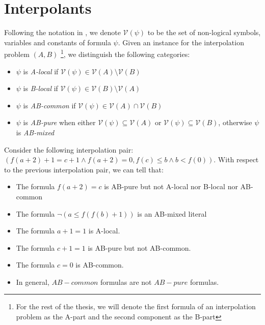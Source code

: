 \section{Interpolants}

Following the notation in \cite{10.1007/11532231_26}, we denote 
$\mathcal{V}(\psi)$ to be the set of non-logical symbols, variables
and constants of formula $\psi$. Given an instance for the interpolation
problem $(A, B)$ \footnote{For the rest of the thesis, we will denote the 
  first formula of an interpolation problem as the A-part 
and the second component as the B-part}, 
we distinguish the following categories:

\begin{itemize}
  \item $\psi$ is \emph{A-local} if $\mathcal{V}(\psi) \in 
    \mathcal{V}(A) \setminus \mathcal{V}(B)$
  \item $\psi$ is \emph{B-local} if $\mathcal{V}(\psi) \in 
    \mathcal{V}(B) \setminus \mathcal{V}(A)$
  \item $\psi$ is \emph{AB-common} if $\mathcal{V}(\psi) \in
    \mathcal{V}(A) \cap \mathcal{V}(B)$
  \item $\psi$ is \emph{AB-pure} when either $\mathcal{V}(\psi) \subseteq 
    \mathcal{V}(A)$ or $\mathcal{V}(\psi) \subseteq \mathcal{V}(B)$, otherwise
    $\psi$ is \emph{AB-mixed}
\end{itemize}

\begin{example} \label{first_example}

  Consider the following interpolation pair: $(f(a + 2) + 1 = c + 1
    \land f(a + 2) = 0
  , f(c) \leq b \land b < f(0))$. With respect to the previous 
  interpolation pair, we can tell that:
  \begin{itemize}
    \item The formula $f(a + 2) = c$ is 
      AB-pure but not A-local nor B-local nor AB-common
    \item The formula $\neg(a \leq f(f(b) + 1))$ is an AB-mixed
      literal
    \item The formula $a + 1 = 1$ is A-local.
    \item The formula $c + 1 = 1$ is AB-pure but not AB-common.
    \item The formula $c = 0$ is AB-common.
    \item In general, $AB-common$ formulas are not $AB-pure$ formulas.
  \end{itemize}
\end{example}


